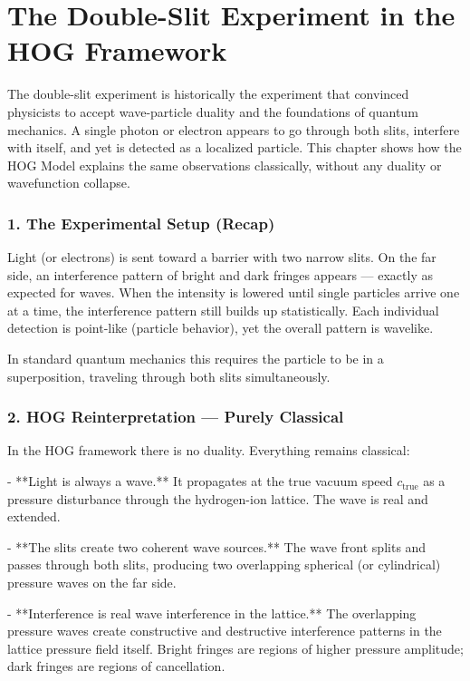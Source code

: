 \documentclass[11pt,a4paper]{book}
\begin{document}
{\chapter{The Double-Slit Experiment in the HOG Framework}

The double-slit experiment is historically the experiment that convinced physicists to accept wave-particle duality and the foundations of quantum mechanics. A single photon or electron appears to go through both slits, interfere with itself, and yet is detected as a localized particle. This chapter shows how the HOG Model explains the same observations classically, without any duality or wavefunction collapse.

\subsection{1. The Experimental Setup (Recap)}
Light (or electrons) is sent toward a barrier with two narrow slits. On the far side, an interference pattern of bright and dark fringes appears — exactly as expected for waves. When the intensity is lowered until single particles arrive one at a time, the interference pattern still builds up statistically. Each individual detection is point-like (particle behavior), yet the overall pattern is wavelike.

In standard quantum mechanics this requires the particle to be in a superposition, traveling through both slits simultaneously.

\subsection{2. HOG Reinterpretation — Purely Classical}

In the HOG framework there is no duality. Everything remains classical:

- **Light is always a wave.** It propagates at the true vacuum speed \( c_{\text{true}} \) as a pressure disturbance through the hydrogen-ion lattice. The wave is real and extended.

- **The slits create two coherent wave sources.** The wave front splits and passes through both slits, producing two overlapping spherical (or cylindrical) pressure waves on the far side.

- **Interference is real wave interference in the lattice.** The overlapping pressure waves create constructive and destructive interference patterns in the lattice pressure field itself. Bright fringes are regions of higher pressure amplitude; dark fringes are regions of cancellation.

}
\end{document}
